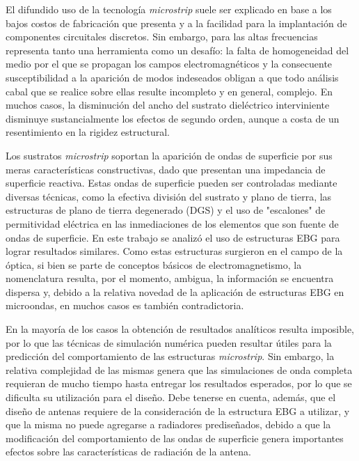 

El difundido uso de la tecnología \textit{microstrip} suele ser explicado en base a los bajos costos de fabricación que presenta y a la facilidad para la implantación de componentes circuitales discretos. Sin embargo, para las altas frecuencias representa tanto una herramienta como un desafío: la falta de homogeneidad del medio por el que se propagan los campos electromagnéticos y la consecuente susceptibilidad a la aparición de modos indeseados obligan a que todo análisis cabal que se realice sobre ellas resulte incompleto y en general, complejo. En muchos casos, la disminución del ancho del sustrato dieléctrico interviniente disminuye sustancialmente los efectos de segundo orden, aunque a costa de un resentimiento en la rigidez estructural.

Los sustratos \textit{microstrip} soportan la aparición de ondas de superficie por sus meras características constructivas, dado que presentan una impedancia de superficie reactiva. Estas ondas de superficie pueden ser controladas mediante diversas técnicas, como la efectiva división del sustrato y plano de tierra, las estructuras de plano de tierra degenerado (DGS) y el uso de "escalones" de permitividad eléctrica en las inmediaciones de los elementos que son fuente de ondas de superficie. En este trabajo se analizó el uso de estructuras EBG para lograr resultados similares. Como estas estructuras surgieron en el campo de la óptica, si bien se parte de conceptos básicos de electromagnetismo, la nomenclatura resulta, por el momento, ambigua, la información se encuentra dispersa y, debido a la relativa novedad de la aplicación de estructuras EBG en microondas, en muchos casos es también contradictoria.

En la mayoría de los casos la obtención de resultados analíticos resulta imposible, por lo que las técnicas de simulación numérica pueden resultar útiles para la predicción del comportamiento de las estructuras \textit{microstrip}. Sin embargo, la relativa complejidad de las mismas genera que las simulaciones de onda completa requieran de mucho tiempo hasta entregar los resultados esperados, por lo que se dificulta su utilización para el diseño. Debe tenerse en cuenta, además, que el diseño de antenas requiere de la consideración de la estructura EBG a utilizar, y que la misma no puede agregarse a radiadores prediseñados, debido a que la modificación del comportamiento de las ondas de superficie genera importantes efectos sobre las características de radiación de la antena.


